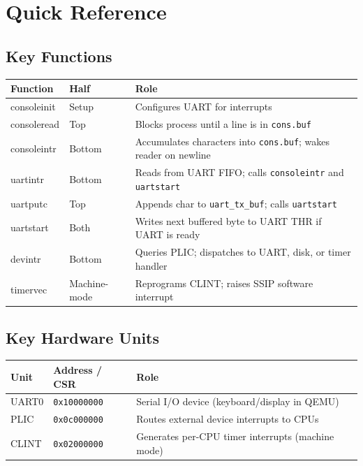 \documentclass[11pt, a4paper]{article}
\begin{document}
\section{Quick Reference}

\subsection{Key Functions}

\begin{center}
\renewcommand{\arraystretch}{1.3}
\begin{tabular}{@{}>{\ttfamily}lp{4.5cm}p{5cm}@{}}
\toprule
\textbf{Function} & \textbf{Half} & \textbf{Role} \\
\midrule
consoleinit      & Setup        & Configures UART for interrupts \\
consoleread      & Top          & Blocks process until a line is in \lstinline|cons.buf| \\
consoleintr      & Bottom       & Accumulates characters into \lstinline|cons.buf|; wakes reader on newline \\
uartintr         & Bottom       & Reads from UART FIFO; calls \lstinline|consoleintr| and \lstinline|uartstart| \\
uartputc         & Top          & Appends char to \lstinline|uart_tx_buf|; calls \lstinline|uartstart| \\
uartstart        & Both         & Writes next buffered byte to UART THR if UART is ready \\
devintr          & Bottom       & Queries PLIC; dispatches to UART, disk, or timer handler \\
timervec         & Machine-mode & Reprograms CLINT; raises SSIP software interrupt \\
\bottomrule
\end{tabular}
\end{center}

\subsection{Key Hardware Units}

\begin{center}
\renewcommand{\arraystretch}{1.3}
\begin{tabular}{@{}llp{7cm}@{}}
\toprule
\textbf{Unit} & \textbf{Address / CSR} & \textbf{Role} \\
\midrule
UART0 & \lstinline|0x10000000| & Serial I/O device (keyboard/display in QEMU) \\
PLIC  & \lstinline|0x0c000000| & Routes external device interrupts to CPUs \\
CLINT & \lstinline|0x02000000| & Generates per-CPU timer interrupts (machine mode) \\
\bottomrule
\end{tabular}
\end{center}
\end{document}
